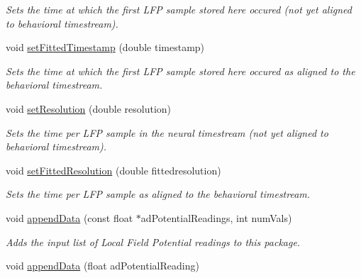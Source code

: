 \begin{DoxyCompactItemize}
\begin{DoxyCompactList}\small\item\em Sets the time at which the first L\-F\-P sample stored here occured (not yet aligned to behavioral timestream). \end{DoxyCompactList}\item 
\hypertarget{class_picto_1_1_l_f_p_data_unit_package_a055925a90bbe8b5698db245a5a7892a3}{void \hyperlink{class_picto_1_1_l_f_p_data_unit_package_a055925a90bbe8b5698db245a5a7892a3}{set\-Fitted\-Timestamp} (double timestamp)}\label{class_picto_1_1_l_f_p_data_unit_package_a055925a90bbe8b5698db245a5a7892a3}

\begin{DoxyCompactList}\small\item\em Sets the time at which the first L\-F\-P sample stored here occured as aligned to the behavioral timestream. \end{DoxyCompactList}\item 
\hypertarget{class_picto_1_1_l_f_p_data_unit_package_a0ed2a9a22b25c0750020c42694ea6ff1}{void \hyperlink{class_picto_1_1_l_f_p_data_unit_package_a0ed2a9a22b25c0750020c42694ea6ff1}{set\-Resolution} (double resolution)}\label{class_picto_1_1_l_f_p_data_unit_package_a0ed2a9a22b25c0750020c42694ea6ff1}

\begin{DoxyCompactList}\small\item\em Sets the time per L\-F\-P sample in the neural timestream (not yet aligned to behavioral timestream). \end{DoxyCompactList}\item 
\hypertarget{class_picto_1_1_l_f_p_data_unit_package_a08ae1396ba9dc8ff7dd0206b6c3d82a6}{void \hyperlink{class_picto_1_1_l_f_p_data_unit_package_a08ae1396ba9dc8ff7dd0206b6c3d82a6}{set\-Fitted\-Resolution} (double fittedresolution)}\label{class_picto_1_1_l_f_p_data_unit_package_a08ae1396ba9dc8ff7dd0206b6c3d82a6}

\begin{DoxyCompactList}\small\item\em Sets the time per L\-F\-P sample as aligned to the behavioral timestream. \end{DoxyCompactList}\item 
void \hyperlink{class_picto_1_1_l_f_p_data_unit_package_a6806b7e274bd7107566abeb5e9fc44a4}{append\-Data} (const float $\ast$ad\-Potential\-Readings, int num\-Vals)
\begin{DoxyCompactList}\small\item\em Adds the input list of Local Field Potential readings to this package. \end{DoxyCompactList}\item 
\hypertarget{class_picto_1_1_l_f_p_data_unit_package_a89fbb9cfeae82635c46204b74a1b1cf1}{void \hyperlink{class_picto_1_1_l_f_p_data_unit_package_a89fbb9cfeae82635c46204b74a1b1cf1}{append\-Data} (float ad\-Potential\-Reading)}\label{class_picto_1_1_l_f_p_data_unit_package_a89fbb9cfeae82635c46204b74a1b1cf1}


\end{DoxyCompactItemize}
